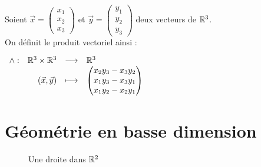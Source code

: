 \begin{definition}
	Soient $\vec{x} = \begin{pmatrix} x_1 \\ x_2 \\ x_3 \end{pmatrix}$ et $\vec{y} = \begin{pmatrix} y_1 \\ y_2 \\ y_3 \end{pmatrix}$ deux vecteurs de $\mathbb{R}^3$.
	\\
	On définit le produit vectoriel ainsi :
	\begin{center}
		$
		\begin{array}{rrcl} \wedge : & \mathbb{R}^3 \times \mathbb{R}^3 & \longrightarrow & \mathbb{R}^3 \\ & (\vec{x}, \vec{y}) & \longmapsto & 
		\begin{pmatrix}
			x_2 y_3 - x_3 y_2 \\
			x_1 y_3 - x_3 y_1 \\
			x_1 y_2 - x_2 y_1
		\end{pmatrix}
		 \end{array}
		$
	\end{center}
\end{definition}

\section{Géométrie en basse dimension}
\begin{figure}[!h]
	\centering
	\caption{Une droite dans $\mathbb{R}^2$}
\end{figure}